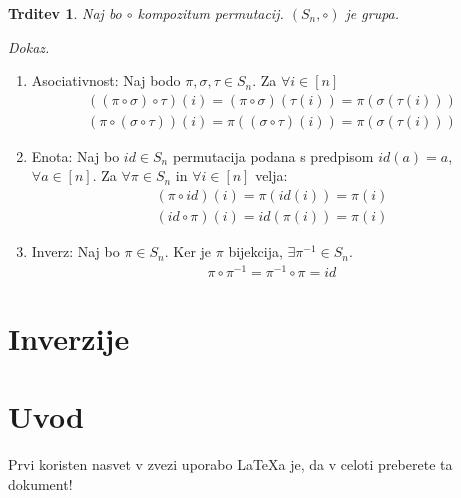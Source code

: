 \documentclass[a4paper, 12pt]{book}
\newtheorem{trditev}{Trditev}[izrek]
\newenvironment{dokaz}{\emph{Dokaz.}\ }{\hspace{\fill}{$\Box$}}
\begin{document}
\begin{trditev}
    Naj bo $\circ$ kompozitum permutacij. $(S_n, \circ)$ je grupa.
\end{trditev}
\begin{dokaz}
    \begin{enumerate}
        \item Asociativnost: Naj bodo $\pi, \sigma, \tau \in S_n$. Za $\forall i \in [n]$ 
        \begin{align}
            ((\pi \circ \sigma) \circ \tau)(i) = (\pi \circ \sigma)(\tau(i)) = \pi(\sigma(\tau(i)))\\
            (\pi \circ (\sigma \circ \tau))(i) = \pi((\sigma \circ \tau)(i)) = \pi(\sigma(\tau(i))) 
        \end{align}
        \item Enota: Naj bo $id \in S_n$ permutacija podana s predpisom $id(a) = a$, $\forall a \in [n]$. Za $\forall \pi \in S_n$ in $\forall i \in [n]$ velja:
        \begin{align}
            (\pi \circ id)(i) = \pi(id(i)) = \pi(i) \\
            (id \circ \pi)(i) = id(\pi(i)) = \pi(i)
        \end{align}
        \item Inverz: Naj bo $\pi \in S_n$. Ker je $\pi$ bijekcija, $\exists \pi^{-1} \in S_n$.
        \begin{align}
            \pi \circ \pi^{-1} = \pi^{-1} \circ \pi = id
        \end{align}
    \end{enumerate}
\end{dokaz}

\chapter{ Inverzije }






\chapter{Uvod}
Prvi koristen nasvet v zvezi uporabo \LaTeX{a} je, da v celoti preberete ta dokument!
\end{document}
